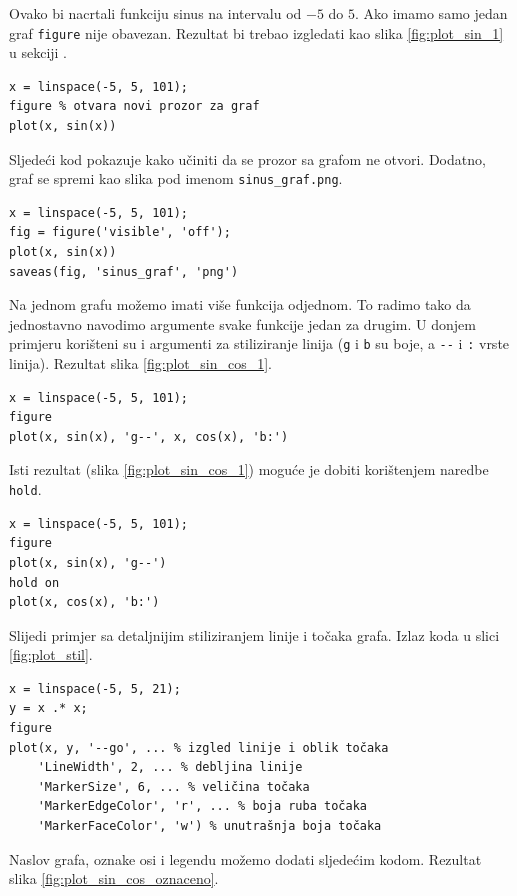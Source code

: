 \documentclass[a4paper, 10pt]{article}
\newcommand{\spec}[1]{\texttt{#1}} %
\begin{document}
Ovako bi nacrtali funkciju sinus na intervalu od $-5$ do $5$.
Ako imamo samo jedan graf \spec{figure} nije obavezan.
Rezultat bi trebao izgledati kao slika \ref{fig:plot_sin_1} u sekciji .

\begin{lstlisting}
x = linspace(-5, 5, 101);
figure % otvara novi prozor za graf
plot(x, sin(x))
\end{lstlisting}

Sljedeći kod pokazuje kako učiniti da se prozor sa grafom ne otvori.
Dodatno, graf se spremi kao slika pod imenom \spec{sinus\_graf.png}.

\begin{lstlisting}
x = linspace(-5, 5, 101);
fig = figure('visible', 'off');
plot(x, sin(x))
saveas(fig, 'sinus_graf', 'png')
\end{lstlisting}

Na jednom grafu možemo imati više funkcija odjednom.
To radimo tako da jednostavno navodimo argumente svake funkcije jedan za drugim.
U donjem primjeru korišteni su i argumenti za stiliziranje linija (\spec{g} i \spec{b} su boje, a \spec{-{}-} i \spec{:} vrste linija).
Rezultat slika \ref{fig:plot_sin_cos_1}.

\begin{lstlisting}
x = linspace(-5, 5, 101);
figure
plot(x, sin(x), 'g--', x, cos(x), 'b:')
\end{lstlisting}

Isti rezultat (slika \ref{fig:plot_sin_cos_1}) moguće je dobiti korištenjem naredbe \spec{hold}.

\begin{lstlisting}
x = linspace(-5, 5, 101);
figure
plot(x, sin(x), 'g--')
hold on
plot(x, cos(x), 'b:')
\end{lstlisting}

Slijedi primjer sa detaljnijim stiliziranjem linije i točaka grafa.
Izlaz koda u slici \ref{fig:plot_stil}.

\begin{lstlisting}
x = linspace(-5, 5, 21);
y = x .* x;
figure
plot(x, y, '--go', ... % izgled linije i oblik točaka
    'LineWidth', 2, ... % debljina linije
    'MarkerSize', 6, ... % veličina točaka
    'MarkerEdgeColor', 'r', ... % boja ruba točaka
    'MarkerFaceColor', 'w') % unutrašnja boja točaka
\end{lstlisting}

Naslov grafa, oznake osi i legendu možemo dodati sljedećim kodom.
Rezultat slika \ref{fig:plot_sin_cos_oznaceno}.
\end{document}
